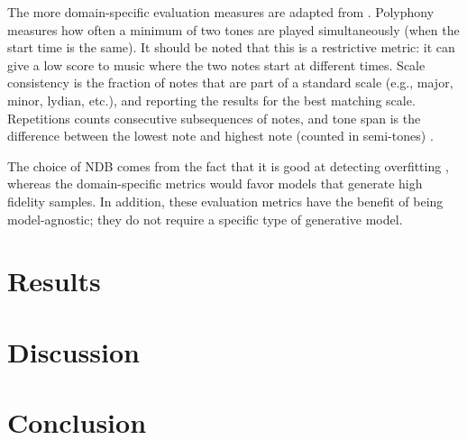 \documentclass[a4paper]{book}
\begin{document}
The more domain-specific evaluation measures are adapted from \textcite{mogren_c-rnn-gan_2016}. Polyphony measures how often a minimum of two tones are played simultaneously (when the start time is the same). It should be noted that this is a restrictive metric: it can give a low score to music where the two notes start at different times. Scale consistency is the fraction of notes that are part of a standard scale (e.g., major, minor, lydian, etc.), and reporting the results for the best matching scale. Repetitions counts consecutive subsequences of notes, and tone span is the difference between the lowest note and highest note (counted in semi-tones) \parencite{mogren_c-rnn-gan_2016}.

The choice of NDB comes from the fact that it is good at detecting overfitting \parencite{borji_pros_2018}, whereas the domain-specific metrics would favor models that generate high fidelity samples. In addition, these evaluation metrics have the benefit of being model-agnostic; they do not require a specific type of generative model.

\chapter{Results}\label{chap:results}

\chapter{Discussion}\label{chap:discussion}

\chapter{Conclusion}\label{chap:conclusion}

\printbibliography
\end{document}
